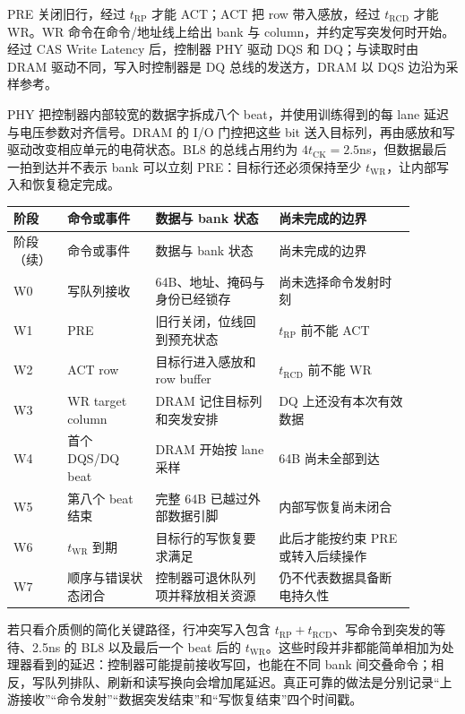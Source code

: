 
PRE 关闭旧行，经过 $t_{\mathrm{RP}}$ 才能 ACT；ACT 把 row  带入感放，经过 $t_{\mathrm{RCD}}$ 才能 WR。WR 命令在命令/地址线上给出 bank 与 column，并约定写突发何时开始。经过 CAS Write Latency 后，控制器 PHY 驱动 DQS 和 DQ；与读取时由 DRAM 驱动不同，写入时控制器是 DQ 总线的发送方，DRAM 以 DQS 边沿为采样参考。

PHY 把控制器内部较宽的数据字拆成八个 beat，并使用训练得到的每 lane 延迟与电压参数对齐信号。DRAM 的 I/O 门控把这些 bit 送入目标列，再由感放和写驱动改变相应单元的电荷状态。BL8 的总线占用约为 $4t_{\mathrm{CK}}=2.5$ns，但数据最后一拍到达并不表示 bank 可以立刻 PRE：目标行还必须保持至少 $t_{\mathrm{WR}}$，让内部写入和恢复稳定完成。

\begin{longtable}{L{0.10\linewidth}L{0.20\linewidth}L{0.28\linewidth}L{0.31\linewidth}}
\toprule
阶段 & 命令或事件 & 数据与 bank 状态 & 尚未完成的边界 \\
\midrule
\endfirsthead
\toprule
阶段（续） & 命令或事件 & 数据与 bank 状态 & 尚未完成的边界 \\
\midrule
\endhead
W0 & 写队列接收 & 64B、地址、掩码与身份已经锁存 & 尚未选择命令发射时刻 \\\tablerowrule
W1 & PRE & 旧行关闭，位线回到预充状态 & $t_{\mathrm{RP}}$ 前不能 ACT \\\tablerowrule
W2 & ACT row  & 目标行进入感放和 row buffer & $t_{\mathrm{RCD}}$ 前不能 WR \\\tablerowrule
W3 & WR target column & DRAM 记住目标列和突发安排 & DQ 上还没有本次有效数据 \\\tablerowrule
W4 & 首个 DQS/DQ beat & DRAM 开始按 lane 采样 & 64B 尚未全部到达 \\\tablerowrule
W5 & 第八个 beat 结束 & 完整 64B 已越过外部数据引脚 & 内部写恢复尚未闭合 \\\tablerowrule
W6 & $t_{\mathrm{WR}}$ 到期 & 目标行的写恢复要求满足 & 此后才能按约束 PRE 或转入后续操作 \\\tablerowrule
W7 & 顺序与错误状态闭合 & 控制器可退休队列项并释放相关资源 & 仍不代表数据具备断电持久性 \\
\bottomrule
\end{longtable}

若只看介质侧的简化关键路径，行冲突写入包含 $t_{\mathrm{RP}}+t_{\mathrm{RCD}}$、写命令到突发的等待、2.5ns 的 BL8 以及最后一个 beat 后的 $t_{\mathrm{WR}}$。这些时段并非都能简单相加为处理器看到的延迟：控制器可能提前接收写回，也能在不同 bank 间交叠命令；相反，写队列排队、刷新和读写换向会增加尾延迟。真正可靠的做法是分别记录“上游接收”“命令发射”“数据突发结束”和“写恢复结束”四个时间戳。

